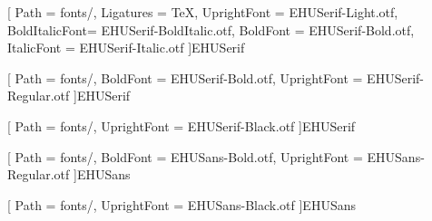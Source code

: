 \ifdefined\euskara

 \newfontfamily{\serif}[
 Path          = fonts/,
 Ligatures     = TeX,
 UprightFont   = EHUSerif-Light.otf,
 BoldItalicFont= EHUSerif-BoldItalic.otf,
 BoldFont      = EHUSerif-Bold.otf,
 ItalicFont    = EHUSerif-Italic.otf
 ]{EHUSerif}
  
 \newfontfamily{\serifthick}[
 Path          = fonts/,
 BoldFont      = EHUSerif-Bold.otf,
 UprightFont   = EHUSerif-Regular.otf
 ]{EHUSerif}
 
 \newfontfamily{\serifblack}[
 Path          = fonts/,
 UprightFont   = EHUSerif-Black.otf
 ]{EHUSerif}
 
\else

 \setmainfont[
 Path          = fonts/,
 Ligatures     = TeX,
 UprightFont   = EHUSans-Light.otf,
 BoldItalicFont= EHUSans-BoldItalic.otf,
 BoldFont      = EHUSans-Bold.otf,
 ItalicFont    = EHUSans-Italic.otf
 ]{EHUSans}
 
\newfontfamily{\sansthick}[
 Path          = fonts/,
 BoldFont      = EHUSans-Bold.otf,
 UprightFont   = EHUSans-Regular.otf
 ]{EHUSans}
 
 \newfontfamily{\sansblack}[
 Path          = fonts/,
 UprightFont   = EHUSans-Black.otf
 ]{EHUSans}

\fi



\ifdefined\euskara
\newcommand{\upvehu}{Euskal Herriko Unibertsitatea UPV/EHU}
\newcommand{\tfglabel}{Gradu Amaierako Lana}
\newcommand{\tfmlabel}{Master Tesia}
\newcommand{\phdlabel}{Doktorego Tesia}
\newcommand{\euivg}{Vitoria-Gasteizko Ingeniaritza Eskola}
\renewcommand{\abstract}{Laburpena}
\newcommand{\directorlabel}{Zuzendaria}
\newcommand{\studentlabel}{Ikaslea}
\newcommand{\courselabel}{Ikasturtea}
\newcommand{\datelabel}{Data}
\newcommand{\glossarylabel}{Glosarioa}
\newcommand{\acronymslabel}{Akronimoak}
\newcommand{\algorithmlabel}{Algoritmoa}
\newcommand{\listalgorithmlabel}{Algoritmoen aurkibidea}
\fi
\ifdefined\castellano
\newcommand{\upvehu}{Universidad del País Vasco UPV/EHU}
\newcommand{\tfglabel}{Trabajo de Fin de Grado}
\newcommand{\tfmlabel}{Tesis de Máster}
\newcommand{\phdlabel}{Tesis Doctoral}
\newcommand{\euivg}{Escuela de Ingeniería de Vitoria-Gasteiz}
\renewcommand{\abstract}{Resumen}
\newcommand{\directorlabel}{Director(a)}
\newcommand{\studentlabel}{Alumno/Alumna}
\newcommand{\courselabel}{Curso}
\newcommand{\datelabel}{Fecha}
\newcommand{\glossarylabel}{Glosario}
\newcommand{\acronymslabel}{Acrónimos}
\newcommand{\algorithmlabel}{Algoritmo}
\newcommand{\listalgorithmlabel}{Índice de algoritmos}
\fi
\ifdefined\english
\newcommand{\upvehu}{University of the Basque Country UPV/EHU}
\newcommand{\tfglabel}{Bachelor Thesis}
\newcommand{\tfmlabel}{Master Thesis}
\newcommand{\phdlabel}{PhD Dissertation}
\newcommand{\euivg}{Faculty of Engineering of Vitoria-Gasteiz}
\renewcommand{\abstract}{Abstract}
\newcommand{\directorlabel}{Advisor}
\newcommand{\studentlabel}{Student}
\newcommand{\courselabel}{Course}
\newcommand{\datelabel}{Date}
\newcommand{\glossarylabel}{Glossary}
\newcommand{\acronymslabel}{Acronyms}
\newcommand{\algorithmlabel}{Algorithm}
\newcommand{\listalgorithmlabel}{Index of algorithms}
\fi

